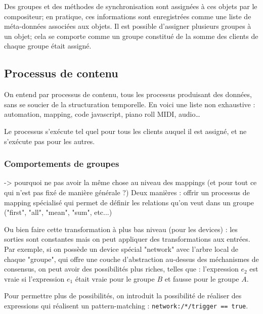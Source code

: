 \documentclass{article}
\begin{document}
Des groupes et des méthodes de synchronisation sont assignées à ces objets par le compositeur; en pratique, ces informations sont enregistrées comme une liste de méta-données associées aux objets.
Il est possible d'assigner plusieurs groupes à un objet; cela se comporte comme un groupe constitué de la somme des clients de chaque groupe était assigné.

\subsection{Processus de contenu}
On entend par processus de contenu, tous les processus produisant des données, sans se soucier de la structuration temporelle. En voici une liste non exhaustive : automation, mapping, code javascript, piano roll MIDI, audio\dots

Le processus s'exécute tel quel pour tous les clients auquel il est assigné, 
et ne s'exécute pas pour les autres.


\subsubsection{Comportements de groupes}
-> pourquoi ne pas avoir la même chose au niveau des mappings (et pour tout ce qui n'est pas fixé de manière générale ?)
Deux manières : offrir un processus de mapping spécialisé qui permet de définir les relations qu'on veut dans un groupe ("first", "all", "mean", "sum", etc...)

Ou bien faire cette transformation à plus bas niveau (pour les devices) : les sorties sont constantes mais on peut appliquer des transformations aux entrées.
Par exemple, si on possède un device spécial "network" avec l'arbre local de chaque "groupe", qui offre une couche d'abstraction au-dessus des méchanismes de consensus, on peut avoir des possibilités plus riches, telles que : l'expression $e_2$ est vraie si l'expression $e_1$ était vraie pour le groupe $B$ et fausse pour le groupe $A$.

Pour permettre plus de possibilités, on introduit la possibilité de réaliser des expressions qui réalisent un pattern-matching : 
\lstinline|network:/*/trigger == true|.
\end{document}
